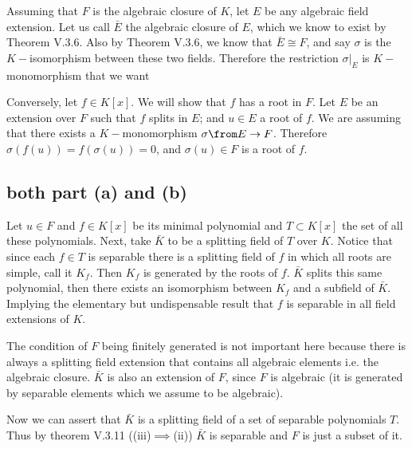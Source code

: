 Assuming that $F$ is the algebraic closure of $K$, let $E$ be any algebraic field extension.
Let us call $\bar E$ the algebraic closure of $E$, which we know to exist by Theorem V.3.6.
Also by  Theorem V.3.6, we know that $\bar E \cong F$, and say $\sigma$ is the $K-$isomorphism between these two fields.
Therefore the restriction $\sigma|_E$ is $K-$monomorphism that we want

Conversely, let $f\in K[x]$. We will show that $f$ has a root in $F$.
Let $E$ be an extension over $F$ such that $f$ splits in $E$; and $u\in E$ a root of $f$.
We are assuming that there exists a $K-$monomorphism $\sigma\from E\to F$.
Therefore $\sigma(f(u))=f(\sigma(u))=0$, and $\sigma(u)\in F$ is a root of $f$. 

\subsection*{both part (a) and (b)}
Let $u\in F$ and $f\in K[x]$ be its minimal polynomial and $T\subset K[x]$ the set of all these polynomials.
Next, take $\bar K$ to be a splitting field of $T$ over $K$. 
Notice that since each $f\in T$ is separable there is a splitting field of $f$ in which all roots are simple, call it $K_f$. 
Then $K_f$ is generated by the roots of $f$.
$\bar K$ splits this same polynomial, then there exists an isomorphism between $K_f$ and a subfield of $\bar K$.
Implying the elementary but undispensable result that $f$ is separable in all field extensions of $K$.

The condition of $F$ being finitely generated is not important here because there is always a splitting field extension that contains all algebraic elements i.e. the algebraic closure.
$\bar K$ is also an extension of $F$, since $F$ is algebraic (it is generated by separable elements which we assume to be algebraic).

Now we can assert that $\bar K$ is a splitting field of a set of separable polynomials $T$.
Thus by theorem V.3.11 ((iii)$\implies $(ii)) $\bar K$ is separable and $F$ is just a subset of it.
